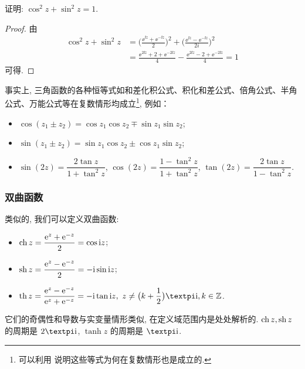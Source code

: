 \begin{example}
  证明: $\cos^2z+\sin^2z=1$.
\end{example}
\begin{proof}
  由
  \begin{align*}
    \cos^2z+\sin^2z&
    =\biggl(\frac{\ee^{\ii z}+\ee^{-\ii z}}2\biggr)^2
      +\biggl(\frac{\ee^{\ii z}-\ee^{-\ii z}}{2i}\biggr)^2\\&
    =\frac{\ee^{2\ii z}+2+\ee^{-2\ii z}}4-\frac{\ee^{2\ii z}-2+\ee^{-2\ii z}}4
    =1
  \end{align*}
  可得.
\end{proof}

事实上, 三角函数的各种恒等式如和差化积公式、积化和差公式、倍角公式、半角公式、万能公式等在复数情形均成立\footnote{%
  可以利用 说明这些等式为何在复数情形也是成立的.
}, 例如：

\begin{itemize}
  \item $\cos(z_1\pm z_2)=\cos z_1 \cos z_2\mp \sin z_1 \sin z_2$;
  \item $\sin(z_1\pm z_2)=\sin z_1 \cos z_2\pm\cos z_1 \sin z_2$;
  \item $\sin(2z)=\dfrac{2\tan z}{1+\tan^2 z}$, 
    $\cos(2z)=\dfrac{1-\tan^2 z}{1+\tan^2 z}$, 
    $\tan(2z)=\dfrac{2\tan z}{1-\tan^2 z}$.
\end{itemize}


\subsubsection{双曲函数}

类似的, 我们可以定义双曲函数:
\begin{itemize}[addsep]
  \item {} $\operatorname{ch} z=\dfrac{\mathrm{e}^z+\mathrm{e}^{-z}}2=\cos \mathrm{i} z$;
  \item {} $\operatorname{sh} z=\dfrac{\mathrm{e}^z-\mathrm{e}^{-z}}2=-\mathrm{i}\sin \mathrm{i} z$;
  \item {} $\tanh z=\dfrac{\ee^z-\ee^{-z}}{\ee^z+\ee^{-z}}=-\ii\tan \ii z,\ z\neq \bigl(k+\dfrac12\bigr)\cpi\ii, k\in\BZ$.
\end{itemize}

它们的奇偶性和导数与实变量情形类似, 在定义域范围内是处处解析的.
$\operatorname{ch} z,\operatorname{sh} z$ 的周期是 $2\cpi\ii$, $\tanh z$ 的周期是 $\cpi\ii$.

